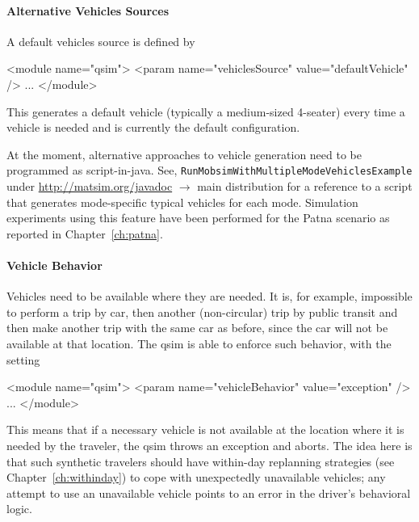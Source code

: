 \paragraph{Alternative Vehicles Sources}

A default vehicles source is defined by
\begin{xml}
<module name="qsim">
   <param name="vehiclesSource" value="defaultVehicle" />
   ...
</module>
\end{xml}
This generates a default vehicle (typically a medium-sized 4-seater) every time a vehicle is needed and is currently the default configuration.

At the moment, alternative approaches to vehicle generation need to be programmed as script-in-\gls{java}.  
See, \eg
\lstinline{RunMobsimWithMultipleModeVehiclesExample} under \url{http://matsim.org/javadoc} $\to$ main distribution
for a reference to a script that generates mode-specific typical vehicles for each mode.
Simulation experiments 
using this feature have been performed for the Patna scenario as reported in Chapter~\ref{ch:patna}.


\paragraph{Vehicle Behavior}

Vehicles need to be available where they are needed.  It is, for example, impossible to perform a trip by car, then another (non-circular) trip by public transit and then make another trip with the same car as before, since the car will not be available at that location.  The \gls{qsim} is able to enforce such behavior, with the setting
\begin{xml}
<module name="qsim">
   <param name="vehicleBehavior" value="exception" />
   ...
</module>
\end{xml}
This means that if a necessary vehicle is not available at the location where it is needed by the traveler, the \gls{qsim} throws an exception and aborts.  The idea here is that such synthetic travelers should have within-day replanning strategies (see Chapter~\ref{ch:withinday}) to cope with unexpectedly unavailable vehicles; any attempt to use an unavailable vehicle points to an error in the driver's behavioral logic.

